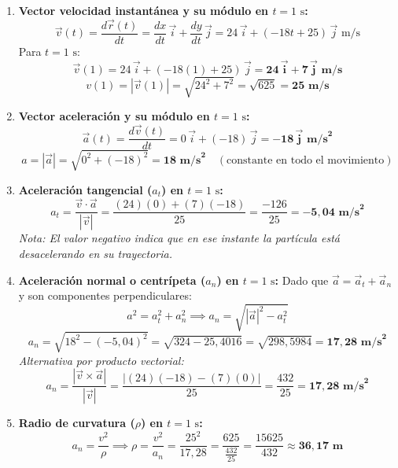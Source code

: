 ﻿\documentclass[11pt,a4paper]{article}
\begin{document}
\begin{enumerate}[label=\textbf{\alph*)}, leftmargin=2em, itemsep=7pt]
    \item \textbf{Vector velocidad instantánea y su módulo en $t = 1\text{ s}$:}
    \[
    \vec{v}(t) = \frac{d\vec{r}(t)}{dt} = \frac{dx}{dt}\,\vec{i} + \frac{dy}{dt}\,\vec{j} = 24\,\vec{i} + (-18t + 25)\,\vec{j}\text{ m/s}
    \]
    Para $t = 1\text{ s}$:
    \[
    \vec{v}(1) = 24\,\vec{i} + (-18(1) + 25)\,\vec{j} = \mathbf{24\,\vec{i} + 7\,\vec{j}\text{ m/s}}
    \]
    \[
    v(1) = |\vec{v}(1)| = \sqrt{24^2 + 7^2} = \sqrt{625} = \mathbf{25\text{ m/s}}
    \]

    \item \textbf{Vector aceleración y su módulo en $t = 1\text{ s}$:}
    \[
    \vec{a}(t) = \frac{d\vec{v}(t)}{dt} = 0\,\vec{i} + (-18)\,\vec{j} = \mathbf{-18\,\vec{j}\text{ m/s}^2}
    \]
    \[
    a = |\vec{a}| = \sqrt{0^2 + (-18)^2} = \mathbf{18\text{ m/s}^2} \quad (\text{constante en todo el movimiento})
    \]

    \item \textbf{Aceleración tangencial ($a_t$) en $t = 1\text{ s}$:}
    \[
    a_t = \frac{\vec{v} \cdot \vec{a}}{|\vec{v}|} = \frac{(24)(0) + (7)(-18)}{25} = \frac{-126}{25} = \mathbf{-5{,}04\text{ m/s}^2}
    \]
    \textit{Nota: El valor negativo indica que en ese instante la partícula está desacelerando en su trayectoria.}

    \item \textbf{Aceleración normal o centrípeta ($a_n$) en $t = 1\text{ s}$:}
    Dado que $\vec{a} = \vec{a}_t + \vec{a}_n$ y son componentes perpendiculares:
    \[
    a^2 = a_t^2 + a_n^2 \implies a_n = \sqrt{|\vec{a}|^2 - a_t^2}
    \]
    \[
    a_n = \sqrt{18^2 - (-5{,}04)^2} = \sqrt{324 - 25{,}4016} = \sqrt{298{,}5984} = \mathbf{17{,}28\text{ m/s}^2}
    \]
    \textit{Alternativa por producto vectorial:}
    \[
    a_n = \frac{|\vec{v} \times \vec{a}|}{|\vec{v}|} = \frac{|(24)(-18) - (7)(0)|}{25} = \frac{432}{25} = \mathbf{17{,}28\text{ m/s}^2}
    \]

    \item \textbf{Radio de curvatura ($\rho$) en $t = 1\text{ s}$:}
    \[
    a_n = \frac{v^2}{\rho} \implies \rho = \frac{v^2}{a_n} = \frac{25^2}{17{,}28} = \frac{625}{\frac{432}{25}} = \frac{15625}{432} \approx \mathbf{36{,}17\text{ m}}
    \]
\end{enumerate}
\end{document}

